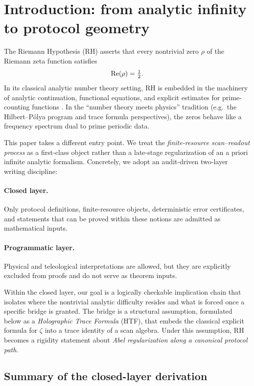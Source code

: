 
\section{Introduction: from analytic infinity to protocol geometry}
\label{sec:introduction}

The Riemann Hypothesis (RH) asserts that every nontrivial zero $\rho$ of the Riemann zeta function satisfies
\[
\operatorname{Re}(\rho)=\tfrac{1}{2}.
\]
In its classical analytic number theory setting, RH is embedded in the machinery of analytic continuation, functional equations, and explicit estimates for prime-counting functions \cite{Titchmarsh1986, Edwards1974, IwaniecKowalski2004}.
In the ``number theory meets physics'' tradition (e.g.\ the Hilbert--P\'olya program and trace formula perspectives), the zeros behave like a frequency spectrum dual to prime periodic data.

This paper takes a different entry point.
We treat the \emph{finite-resource scan--readout process} as a first-class object rather than a late-stage regularization of an a priori infinite analytic formalism.
Concretely, we adopt an audit-driven two-layer writing discipline:

\paragraph{Closed layer.}
Only protocol definitions, finite-resource objects, deterministic error certificates, and statements that can be proved within these notions are admitted as mathematical inputs.

\paragraph{Programmatic layer.}
Physical and teleological interpretations are allowed, but they are explicitly excluded from proofs and do not serve as theorem inputs.

Within the closed layer, our goal is a logically checkable implication chain that isolates where the nontrivial analytic difficulty resides and what is forced once a specific bridge is granted.
The bridge is a structural assumption, formulated below as a \emph{Holographic Trace Formula} (HTF), that embeds the classical explicit formula for $\zeta$ into a trace identity of a scan algebra.
Under this assumption, RH becomes a rigidity statement about \emph{Abel regularization along a canonical protocol path}.

\subsection{Summary of the closed-layer derivation}
\label{sec:intro_summary}


